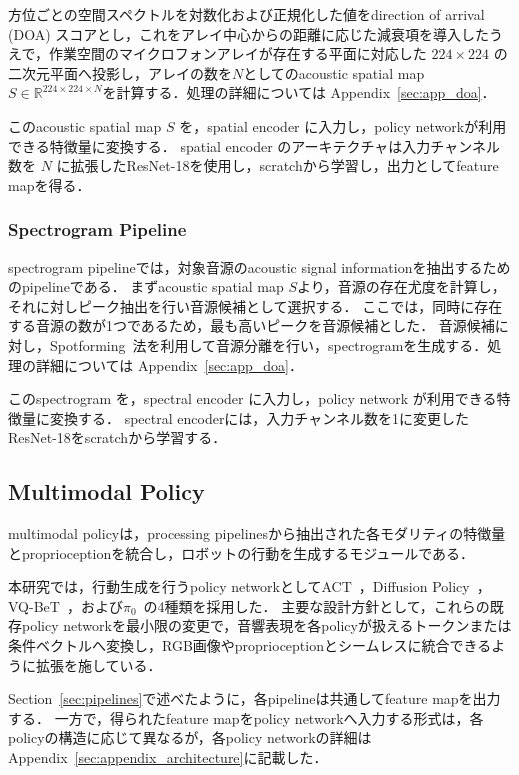 \documentclass{article}
\begin{document}
	方位ごとの空間スペクトルを対数化および正規化した値をdirection of arrival (DOA) スコアとし，これをアレイ中心からの距離に応じた減衰項を導入したうえで，作業空間のマイクロフォンアレイが存在する平面に対応した $224\times224$ の二次元平面へ投影し，アレイの数を$N$としてのacoustic spatial map $S\in\mathbb{R}^{224\times224\times N}$を計算する．処理の詳細については Appendix~\ref{sec:app_doa}．
	
	このacoustic spatial map $S$ を，spatial encoder に入力し，policy networkが利用できる特徴量に変換する．
	spatial encoder のアーキテクチャは入力チャンネル数を $N$ に拡張したResNet-18を使用し，scratchから学習し，出力としてfeature mapを得る．
	

\subsubsection{Spectrogram Pipeline}
\label{sec:spec}
	spectrogram pipelineでは，対象音源のacoustic signal informationを抽出するためのpipelineである．
	まずacoustic spatial map $S$より，音源の存在尤度を計算し，それに対しピーク抽出を行い音源候補として選択する．
	ここでは，同時に存在する音源の数が1つであるため，最も高いピークを音源候補とした．
	音源候補に対し，Spotforming~\citep{spotforming_nmf}法を利用して音源分離を行い，spectrogramを生成する．処理の詳細については Appendix~\ref{sec:app_doa}．

	このspectrogram を，spectral encoder に入力し，policy network が利用できる特徴量に変換する．
	spectral encoderには，入力チャンネル数を1に変更したResNet-18をscratchから学習する．


\subsection{Multimodal Policy}
\label{sec:policy}
	multimodal policyは，processing pipelinesから抽出された各モダリティの特徴量とproprioceptionを統合し，ロボットの行動を生成するモジュールである．

	本研究では，行動生成を行うpolicy networkとしてACT~\citep{act}，Diffusion Policy~\citep{diffusionpolicy}，VQ-BeT~\citep{vqbet}，および$\pi_0$~\citep{pi0}の4種類を採用した．
	主要な設計方針として，これらの既存policy networkを最小限の変更で，音響表現を各policyが扱えるトークンまたは条件ベクトルへ変換し，RGB画像やproprioceptionとシームレスに統合できるように拡張を施している．

	Section~\ref{sec:pipelines}で述べたように，各pipelineは共通してfeature mapを出力する．
	一方で，得られたfeature mapをpolicy networkへ入力する形式は，各policyの構造に応じて異なるが，各policy networkの詳細はAppendix~\ref{sec:appendix_architecture}に記載した．
\end{document}
